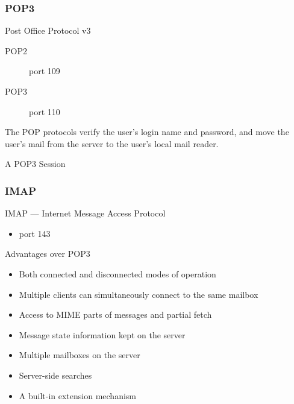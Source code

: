 \begin{frame}
  \begin{center}
  \end{center}
  \label{fig:smtp-pop3}
\end{frame}

\subsubsection{POP3}

\begin{frame}{Post Office Protocol v3}
  \begin{minipage}{.6\linewidth}
    \begin{description}
    \item[POP2] port 109
    \item[POP3] port 110
    \end{description}
    The POP protocols verify the user's login name and password, and move the user's mail
    from the server to the user's local mail reader.
  \end{minipage}\hfill
  \begin{minipage}{.32\linewidth}
    \begin{iblock}{A POP3 Session}
    \begin{center}
       
    \end{center}
    \label{fig:pop3_session}
  \end{iblock}
  \end{minipage}
\end{frame}
  
\subsubsection{IMAP}

\begin{frame}{IMAP --- Internet Message Access Protocol}
  \begin{itemize}
  \item port 143
  \end{itemize}
  \begin{iblock}{Advantages over POP3}
    \begin{itemize}
    \item Both connected and disconnected modes of operation
    \item Multiple clients can simultaneously connect to the same mailbox
    \item Access to MIME parts of messages and partial fetch
    \item Message state information kept on the server
    \item Multiple mailboxes on the server
    \item Server-side searches
    \item A built-in extension mechanism
    \end{itemize}
  \end{iblock}
\end{frame}

